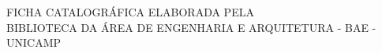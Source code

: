 \begin{titlepage}

    \begin{center}
    FICHA CATALOGRÁFICA ELABORADA PELA \\
    BIBLIOTECA DA ÁREA DE ENGENHARIA E ARQUITETURA - BAE - UNICAMP \\
    \end{center}

\end{titlepage}
